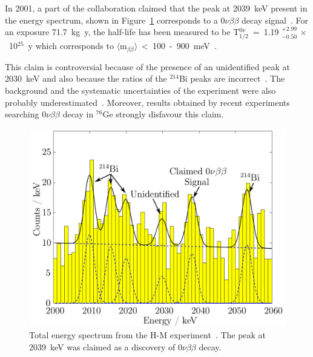 \documentclass[main.tex]{subfiles}
\begin{document}
\bigskip


\NI In 2001, a part of the collaboration claimed that the peak at 2039~keV present in the energy spectrum, shown in Figure~\ref{HMexperimentClaim} corresponds to a 0$\nu\beta\beta$ decay signal~\cite{HeidelbergMoscow2}. For an exposure 71.7~kg~y, the half-life has been measured to be T$_{\text{1/2}}^{0\nu}$~=~1.19 $^{\text{+2.99}}_{-\text{0.50}}$ $\times$~10$^{\text{25}}$~y which corresponds to $\langle \text{m}_{\beta\beta} \rangle$~<~100~-~900~meV~\cite{HeidelbergMoscow2}.


\bigskip


\NI This claim is controversial because of the presence of an unidentified peak at 2030~keV and also because the ratios of the $^{\text{214}}$Bi peaks are incorrect~\cite{HeidelbergMoscow3}. The background and the systematic uncertainties of the experiment were also probably underestimated~\cite{HeidelbergMoscow3}. Moreover, results obtained by recent experiments searching 0$\nu\beta\beta$ decay in $^{\text{76}}$Ge strongly disfavour this claim.



\begin{figure}[h!]
\begin{center}
\includegraphics[scale=0.3]{pictures/Chap2/H-M-experiment-claim.png}
\caption{Total energy spectrum from the H-M experiment~\cite{HeidelbergMoscow1}. The peak at 2039~keV was claimed as a discovery of 0$\nu\beta\beta$ decay.}
\label{HMexperimentClaim}
\end{center}
\end{figure}
\end{document}
